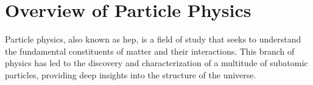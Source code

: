 \section{Overview of Particle Physics}

Particle physics, also known as \gls{hep}, is a field of study that seeks to understand the fundamental
constituents of matter and their interactions. This branch of physics has led to the discovery and characterization of a
multitude of subatomic particles, providing deep insights into the structure of the universe.





